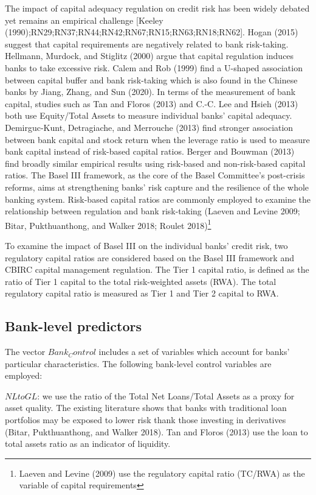 \documentclass{article}
\begin{document}
The impact of capital adequacy regulation on credit risk has been widely
debated yet remains an empirical challenge {[}Keeley
(1990);RN29;RN37;RN44;RN42;RN67;RN15;RN63;RN18;RN62{]}. Hogan (2015)
suggest that capital requirements are negatively related to bank
risk-taking. Hellmann, Murdock, and Stiglitz (2000) argue that capital
regulation induces banks to take excessive risk. Calem and Rob (1999)
find a U-shaped association between capital buffer and bank risk-taking
which is also found in the Chinese banks by Jiang, Zhang, and Sun
(2020). In terms of the measurement of bank capital, studies such as Tan
and Floros (2013) and C.-C. Lee and Hsieh (2013) both use Equity/Total
Assets to measure individual banks' capital adequacy. Demirguc-Kunt,
Detragiache, and Merrouche (2013) find stronger association between bank
capital and stock return when the leverage ratio is used to measure bank
capital instead of risk-based capital ratios. Berger and Bouwman (2013)
find broadly similar empirical results using risk-based and
non-risk-based capital ratios. The Basel III framework, as the core of
the Basel Committee's post-crisis reforms, aims at strengthening banks'
risk capture and the resilience of the whole banking system. Risk-based
capital ratios are commonly employed to examine the relationship between
regulation and bank risk-taking (Laeven and Levine 2009; Bitar,
Pukthuanthong, and Walker 2018; Roulet 2018)\footnote{Laeven and Levine
  (2009) use the regulatory capital ratio (TC/RWA) as the variable of
  capital requirements}

To examine the impact of Basel III on the individual banks' credit risk,
two regulatory capital ratios are considered based on the Basel III
framework and CBIRC capital management regulation. The Tier 1 capital
ratio, is defined as the ratio of Tier 1 capital to the total
risk-weighted assets (RWA). The total regulatory capital ratio is
measured as Tier 1 and Tier 2 capital to RWA.

\hypertarget{bank-level-predictors}{%
\subsection{Bank-level predictors}\label{bank-level-predictors}}

The vector \(Bank_Control\) includes a set of variables which account
for banks' particular characteristics. The following bank-level control
variables are employed:

\(NL to GL\): we use the ratio of the Total Net Loans/Total Assets as a
proxy for asset quality. The existing literature shows that banks with
traditional loan portfolios may be exposed to lower risk thank those
investing in derivatives (Bitar, Pukthuanthong, and Walker 2018). Tan
and Floros (2013) use the loan to total assets ratio as an indicator of
liquidity.
\end{document}
